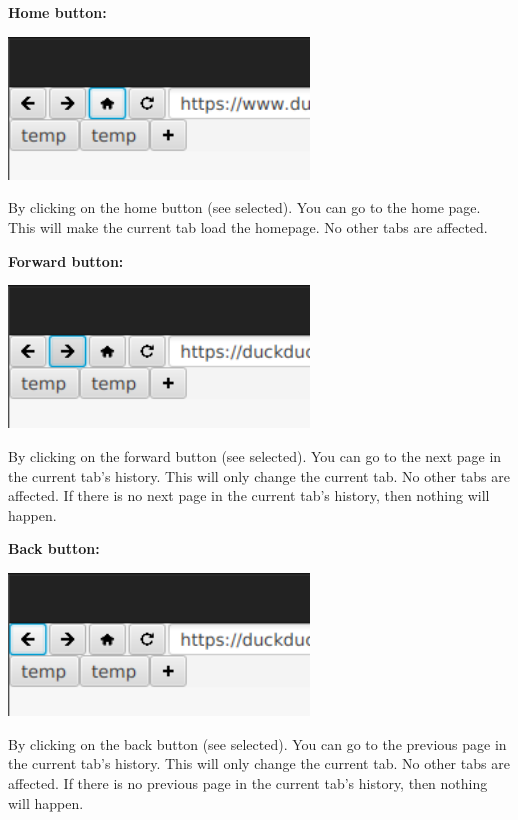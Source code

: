 \documentclass[10pt,a4paper]{report}
\begin{document}
	
	\LARGE \noindent \justifying \textbf{Home button:} \par
	\noindent \includegraphics[width=80mm]{images/home.png} \par
	\normalsize \noindent By clicking on the home button (see selected). You can go to the home page. This will make the current tab load the homepage. No other tabs are affected. \par
	
	
	\LARGE \noindent \justifying \textbf{Forward button:} \par
	\noindent \includegraphics[width=80mm]{images/forward.png} \par
	\normalsize \noindent By clicking on the forward button (see selected). You can go to the next page in the current tab’s history. This will only change the current tab. No other tabs are affected. If there is no next page in the current tab’s history, then nothing will happen. \par
	
	\pagebreak
	
	\LARGE \noindent \justifying \textbf{Back button:} \par
	\noindent \includegraphics[width=80mm]{images/back.png} \par
	\normalsize \noindent By clicking on the back button (see selected). You can go to the previous page in the current tab’s history. This will only change the current tab. No other tabs are affected. If there is no previous page in the current tab’s history, then nothing will happen. \par
	
\end{document}
